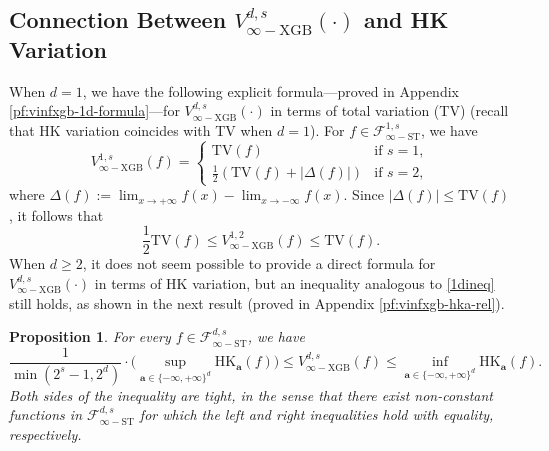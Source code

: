 \documentclass[10pt]{article}
\newtheorem{proposition}{Proposition}
\newcommand{\F}{{\mathcal{F}}}
\newcommand{\fstinf}{{\mathcal{F}^{d, s}_{\infty-\text{ST}}}}
\newcommand{\vinfxgb}{{V^{d, s}_{\infty-\text{XGB}}}}
\newcommand{\tv}{{\text{TV}}}
\newcommand{\hk}{{\text{HK}}}
\newcommand{\abf}{{\mathbf{a}}}
\begin{document}
\subsection{Connection Between $\vinfxgb(\cdot)$ and HK Variation}
\label{sec:connection-vinfxgb-hk}
When $d = 1$, we have the following explicit formula—proved in 
Appendix \ref{pf:vinfxgb-1d-formula}—for $\vinfxgb(\cdot)$ in terms of 
total variation (TV) (recall that HK variation coincides with TV 
when $d = 1$). For $f \in \F^{1, s}_{\infty-\text{ST}}$, we have  
\begin{equation}\label{eq:vinfxgb-1d-formula}
    V^{1, s}_{\infty-\text{XGB}}(f) = 
    \begin{cases}
        \tv(f) & \text{if } s = 1, \\
        \frac{1}{2}\left(\tv(f) + |\Delta(f)|\right) 
        & \text{if } s = 2,
    \end{cases}
\end{equation}
where $\Delta(f) := \lim_{x \rightarrow +\infty} f(x) 
- \lim_{x \rightarrow -\infty} f(x)$. Since
$|\Delta(f)| \le \tv(f)$, it follows that
\begin{equation}\label{1dineq}
    \frac{1}{2}\tv(f) \le V^{1, 2}_{\infty-\text{XGB}}(f) 
    \le \tv(f). 
\end{equation}
When $d \ge 2$, it does not seem possible to provide a direct 
formula for $\vinfxgb(\cdot)$ in terms of HK variation, but an 
inequality analogous to \eqref{1dineq} still holds, as shown in the 
next result (proved in Appendix \ref{pf:vinfxgb-hka-rel}).
\begin{proposition}\label{prop:vinfxgb-hka-rel}
    For every $f \in \fstinf$, we have 
    \begin{equation}\label{eq:vinfxgb-hka-rel}
        \frac{1}{\min(2^s - 1, 2^d)} \cdot 
        \Big(\sup_{\abf \in \{-\infty, +\infty\}^d} 
        \hk_{\abf}(f)\Big) \le \vinfxgb(f) 
        \le \inf_{\abf \in \{-\infty, +\infty\}^d} \hk_{\abf}(f).
    \end{equation}
    Both sides of the inequality are tight, in the sense that there 
    exist non-constant functions in $\fstinf$ for which the left and 
    right inequalities hold with equality, respectively.
\end{proposition}
\end{document}
